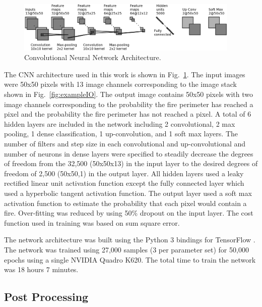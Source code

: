 \documentclass[twocolumn]{svjour3}          %
\begin{document}
\begin{figure}[htb!]
\centering
  \includegraphics[width=0.95\textwidth]{convnet_fig.png}
\caption{Convolutional Neural Network Architecture.}
\label{fig:cnnArchitecture}       %
\end{figure}

The CNN architecture used in this work is shown in Fig.~\ref{fig:cnnArchitecture}.
The input images were 50x50 pixels with 13 image channels corresponding to the
image stack shown in Fig.~\ref{fig:exampleIO}. The output image contains 50x50 pixels
with two image channels corresponding to the probability the fire perimeter has reached
a pixel and the probability the fire perimeter has not reached a pixel.
A total of 6 hidden layers
are included in the network including 2 convolutional, 2 max pooling, 1 dense
classification, 1 up-convolution, and 1 soft max layers. The number of filters
and step size in each convolutional and up-convolutional and number of neurons
in dense layers were specified to steadily decrease the degrees of freedom from the
32,500 (50x50x13) in the input layer to the desired degrees of freedom of
2,500 (50x50,1) in the output layer. All hidden layers used a leaky rectified
linear unit activation function except the fully connected layer which
used a hyperbolic tangent activation function. The output layer used a soft max
activation function to estimate the probability that each pixel would contain
a fire. Over-fitting was reduced by using 50\% dropout on the input layer.
The cost function used in training was based on sum square error.

The network architecture was built using the Python 3 bindings for TensorFlow
\cite{tensorflow2015-whitepaper}. The network was trained using 27,000 samples
(3 per parameter set) for 50,000 epochs using a single NVIDIA Quadro K620.
The total time to train the network was 18 hours
7 minutes.


\subsection{Post Processing}
\label{ss:PP}
\end{document}
